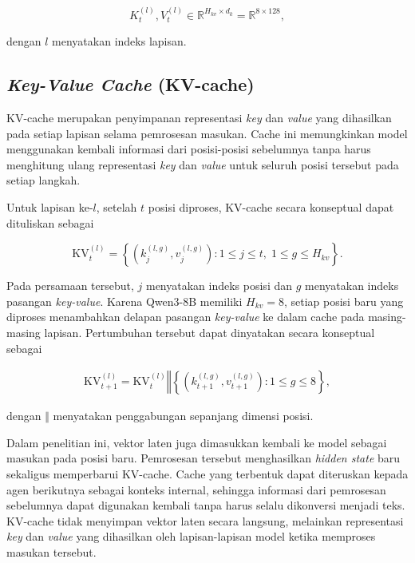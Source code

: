 \begin{equation}
K_t^{(l)},V_t^{(l)}
\in
\mathbb{R}^{H_{kv}\times d_k}
=
\mathbb{R}^{8\times128},
\label{eq:m-arch-kv-dim}
\end{equation}

dengan $l$ menyatakan indeks lapisan.

\subsection{\textit{Key-Value Cache} (KV-cache)}
\label{subsec:m-kvcache}

KV-cache merupakan penyimpanan representasi \textit{key} dan \textit{value} yang dihasilkan pada setiap lapisan selama pemrosesan masukan. Cache ini memungkinkan model menggunakan kembali informasi dari posisi-posisi sebelumnya tanpa harus menghitung ulang representasi \textit{key} dan \textit{value} untuk seluruh posisi tersebut pada setiap langkah.

Untuk lapisan ke-$l$, setelah $t$ posisi diproses, KV-cache secara konseptual dapat dituliskan sebagai

\begin{equation}
\mathrm{KV}^{(l)}_t
=
\left\{
\left(
k_j^{(l,g)},
v_j^{(l,g)}
\right)
:
1\leq j\leq t,\;
1\leq g\leq H_{kv}
\right\}.
\label{eq:m-arch-kv}
\end{equation}

Pada persamaan tersebut, $j$ menyatakan indeks posisi dan $g$ menyatakan indeks pasangan \textit{key-value}. Karena Qwen3-8B memiliki $H_{kv}=8$, setiap posisi baru yang diproses menambahkan delapan pasangan \textit{key-value} ke dalam cache pada masing-masing lapisan. Pertumbuhan tersebut dapat dinyatakan secara konseptual sebagai

\begin{equation}
\begin{aligned}
\mathrm{KV}^{(l)}_{t+1}
=
\mathrm{KV}^{(l)}_t
\mathbin{\Vert}
\left\{
\left(
k_{t+1}^{(l,g)},
v_{t+1}^{(l,g)}
\right)
:
1\leq g\leq 8
\right\},
\end{aligned}
\label{eq:m-arch-kvtumbuh}
\end{equation}

dengan $\Vert$ menyatakan penggabungan sepanjang dimensi posisi.

Dalam penelitian ini, vektor laten juga dimasukkan kembali ke model sebagai masukan pada posisi baru. Pemrosesan tersebut menghasilkan \textit{hidden state} baru sekaligus memperbarui KV-cache. Cache yang terbentuk dapat diteruskan kepada agen berikutnya sebagai konteks internal, sehingga informasi dari pemrosesan sebelumnya dapat digunakan kembali tanpa harus selalu dikonversi menjadi teks. KV-cache tidak menyimpan vektor laten secara langsung, melainkan representasi \textit{key} dan \textit{value} yang dihasilkan oleh lapisan-lapisan model ketika memproses masukan tersebut.



